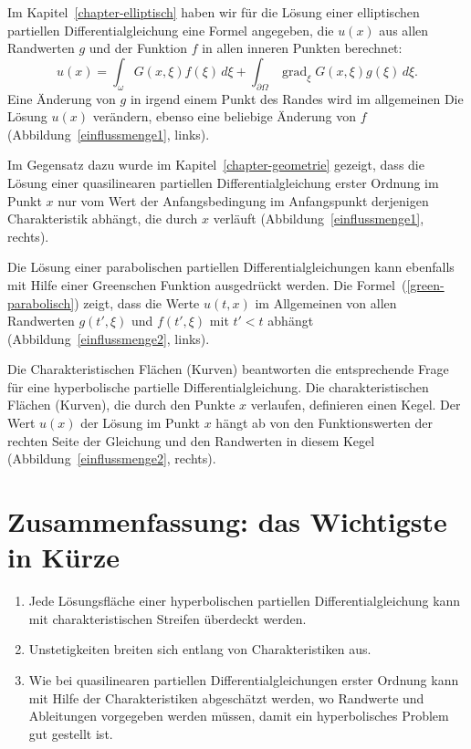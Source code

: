 Im Kapitel~\ref{chapter-elliptisch} haben wir für die Lösung einer
elliptischen partiellen Differentialgleichung eine Formel angegeben,
die $u(x)$ aus allen Randwerten $g$ und der Funktion $f$ in allen 
inneren Punkten berechnet:
\[
u(x)
=
\int_\omega G(x,\xi)f(\xi)\,d\xi
+
\int_{\partial\Omega} \operatorname{grad}_\xi G(x,\xi)g(\xi)\,d\xi.
\]
Eine Änderung von $g$ in irgend einem Punkt des Randes wird im allgemeinen
Die Lösung $u(x)$ verändern, ebenso eine beliebige Änderung von $f$
(Abbildung~\ref{einflussmenge1}, links).

Im Gegensatz dazu wurde im Kapitel~\ref{chapter-geometrie} gezeigt, 
dass die Lösung einer quasilinearen partiellen Differentialgleichung
erster Ordnung im Punkt $x$ nur vom Wert der Anfangsbedingung im Anfangspunkt
derjenigen Charakteristik abhängt, die durch $x$ verläuft
(Abbildung~\ref{einflussmenge1}, rechts).

Die Lösung einer parabolischen partiellen Differentialgleichungen 
kann ebenfalls mit Hilfe einer Greenschen Funktion ausgedrückt werden.
Die Formel~(\ref{green-parabolisch}) zeigt, dass die Werte $u(t,x)$
im Allgemeinen von allen Randwerten $g(t',\xi)$ und $f(t',\xi)$
mit $t'<t$ abhängt (Abbildung~\ref{einflussmenge2}, links).

Die Charakteristischen Flächen (Kurven) beantworten die entsprechende
Frage für eine hyperbolische partielle Differentialgleichung.
Die charakteristischen Flächen (Kurven), die durch den Punkte $x$ verlaufen,
definieren einen Kegel.
Der Wert $u(x)$ der Lösung im Punkt $x$ hängt ab von den
Funktionswerten der rechten Seite der Gleichung und den Randwerten
in diesem Kegel
(Abbildung~\ref{einflussmenge2}, rechts).

\section{Zusammenfassung: das Wichtigste in Kürze}
\begin{enumerate}
\item Jede Lösungsfläche einer hyperbolischen partiellen Differentialgleichung
kann mit charakteristischen Streifen überdeckt werden.
\item Unstetigkeiten breiten sich entlang von Charakteristiken aus.
\item Wie bei quasilinearen partiellen Differentialgleichungen erster
Ordnung kann mit Hilfe der Charakteristiken abgeschätzt werden, wo
Randwerte und Ableitungen vorgegeben werden müssen, damit ein hyperbolisches
Problem gut gestellt ist.
\end{enumerate}

